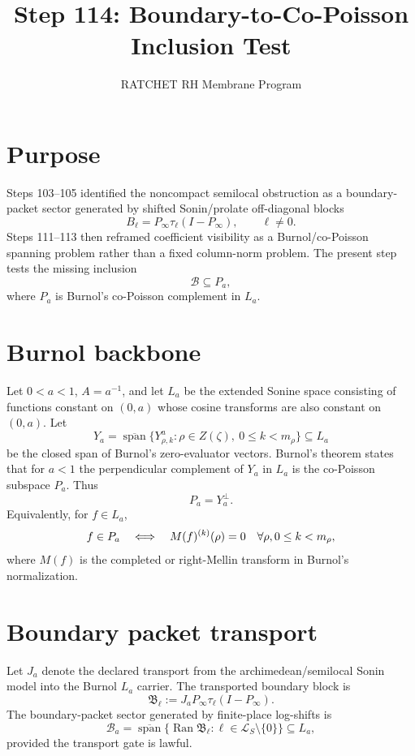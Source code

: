 \documentclass[11pt]{article}
\title{Step 114: Boundary-to-Co-Poisson Inclusion Test}
\author{RATCHET RH Membrane Program}
\date{}
\begin{document}
\maketitle

\section{Purpose}
Steps 103--105 identified the noncompact semilocal obstruction as a boundary-packet sector generated by shifted Sonin/prolate off-diagonal blocks
\[
  B_\ell=P_\infty\tau_\ell(I-P_\infty),\qquad \ell\ne0.
\]
Steps 111--113 then reframed coefficient visibility as a Burnol/co-Poisson spanning problem rather than a fixed column-norm problem.  The present step tests the missing inclusion
\[
  \mathcal B\subseteq P_a,
\]
where $P_a$ is Burnol's co-Poisson complement in $L_a$.

\section{Burnol backbone}
Let $0<a<1$, $A=a^{-1}$, and let $L_a$ be the extended Sonine space consisting of functions constant on $(0,a)$ whose cosine transforms are also constant on $(0,a)$.  Let
\[
  Y_a=\overline{\operatorname{span}}
  \{Y^a_{\rho,k}: \rho\in Z(\zeta),\ 0\le k<m_\rho\}\subseteq L_a
\]
be the closed span of Burnol's zero-evaluator vectors.  Burnol's theorem states that for $a<1$ the perpendicular complement of $Y_a$ in $L_a$ is the co-Poisson subspace $P_a$.
Thus
\[
  P_a=Y_a^\perp.
\]
Equivalently, for $f\in L_a$,
\[
  f\in P_a
  \quad\Longleftrightarrow\quad
  M(f)^{(k)}(\rho)=0
  \quad\forall \rho,\\ 0\le k<m_\rho,
\]
where $M(f)$ is the completed or right-Mellin transform in Burnol's normalization.

\section{Boundary packet transport}
Let $J_a$ denote the declared transport from the archimedean/semilocal Sonin model into the Burnol $L_a$ carrier.  The transported boundary block is
\[
  \mathfrak B_\ell := J_aP_\infty\tau_\ell(I-P_\infty).
\]
The boundary-packet sector generated by finite-place log-shifts is
\[
  \mathcal B_a
  =\overline{\operatorname{span}}
  \{\operatorname{Ran}\mathfrak B_\ell:
    \ell\in\mathcal L_S\setminus\{0\}\}
  \subseteq L_a,
\]
provided the transport gate is lawful.
\end{document}
